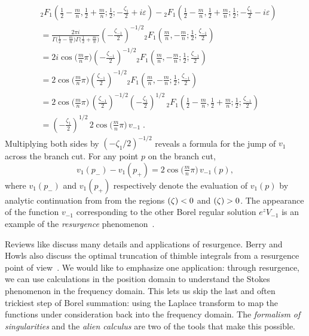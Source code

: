 \documentclass{article}
\let\Im\relax
\DeclareMathOperator{\Im}{Im}
\theoremstyle{definition}
\theoremstyle{plain}
\begin{document}
\begin{align*}
&{}_2F_1\left(\frac{1}{2}-\frac{m}{n},\frac{1}{2}+\frac{m}{n};\frac{1}{2};-\frac{\zeta_1}{2}+i\varepsilon\right)-{}_2F_1\left(\frac{1}{2}-\frac{m}{n},\frac{1}{2}+\frac{m}{n};\frac{1}{2};-\frac{\zeta_1}{2}-i\varepsilon\right) \\
&=\frac{2\pi i}{\Gamma\big(\tfrac{1}{2}-\tfrac{m}{n}\big)\Gamma\big(\tfrac{1}{2}+\tfrac{m}{n}\big)} \left(-\frac{\zeta_{-1}}{2}\right)^{-1/2} {}_2F_1\left(\frac{m}{n},-\frac{m}{n};\frac{1}{2};\frac{\zeta_{-1}}{2}\right) \\
&=2i\cos\big(\tfrac{m}{n}\pi\big) \left(-\frac{\zeta_{-1}}{2}\right)^{-1/2} {}_2F_1\left(\frac{m}{n},-\frac{m}{n};\frac{1}{2};\frac{\zeta_{-1}}{2}\right) \\
&=2\cos\big(\tfrac{m}{n}\pi\big) \left(\frac{\zeta_{-1}}{2}\right)^{-1/2} {}_2F_1\left(\frac{m}{n},-\frac{m}{n};\frac{1}{2};\frac{\zeta_{-1}}{2}\right) \\
&=2\cos\big(\tfrac{m}{n}\pi\big)\, \left(\frac{\zeta_{-1}}{2}\right)^{-1/2} \left(-\frac{\zeta_{1}}{2}\right)^{1/2}\, {}_2F_1\left(\frac{1}{2}-\frac{m}{n},\frac{1}{2}+\frac{m}{n};\frac{1}{2};\frac{\zeta_{-1}}{2}\right) \\
&=\left(-\frac{\zeta_{1}}{2}\right)^{1/2}\,2\cos\big(\tfrac{m}{n}\pi\big)\,v_{-1}\;.
\end{align*}
Multiplying both sides by $(-\zeta_1/2)^{-1/2}$ reveals a formula for the jump of $v_1$ across the branch cut. For any point $p$ on the branch cut,
\begin{equation}\label{eqn:resurg-rel-1}
v_1(p_-) - v_1(p_+) = 2\cos\big(\tfrac{m}{n}\pi\big)\,v_{-1}(p),
\end{equation}
where $v_1(p_-)$ and $v_1(p_+)$ respectively denote the evaluation of $v_1(p)$ by analytic continuation from from the regions $\Im(\zeta) < 0$ and $\Im(\zeta) > 0$. The appearance of the function $v_{-1}$ corresponding to the other Borel regular solution $e^z V_{-1}$ is an example of the {\em resurgence} phenomenon~\cite{EcalleI,EcalleII,EcalleIII}.

Reviews like \cite{diverg-resurg-i,Dorigoni,aniceto2019primer} discuss many details and applications of resurgence. Berry and Howls also discuss the optimal truncation of thimble integrals from a resurgence point of view~\cite{Berry_Howls}. We would like to emphasize one application: through resurgence, we can use calculations in the position domain to understand the Stokes phenomenon in the frequency domain. This lets us skip the last and often trickiest step of Borel summation: using the Laplace transform to map the functions under consideration back into the frequency domain. The {\em formalism of singularities} and the {\em alien calculus} are two of the tools that make this possible.
\end{document}

